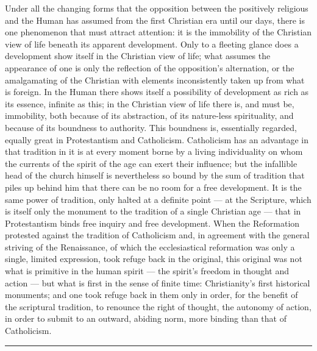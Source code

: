 \documentclass[12pt,a4paper,openany]{book}
\newcommand{\opage}[1]{\marginnote{\footnotesize\textit{[#1]}}}
\begin{document}
Under all the changing forms that the opposition
between the positively religious and the Human has assumed
from the first Christian era until our days, there is
one phenomenon that must attract attention: it is
the immobility of the Christian view of life beneath its apparent
development. Only to a fleeting glance does
a development show itself in the Christian view of life; what assumes
the appearance of one is only the reflection of the opposition's
alternation, or the amalgamating of the Christian with
elements inconsistently taken up from what is foreign. In
the Human there shows itself a possibility of development as rich as
its essence, infinite as this; in the Christian view of life
there is, and must be, immobility, both because
of its abstraction, of its nature-less spirituality, and because
of its boundness to authority. This boundness
is, essentially regarded, equally great in Protestantism and Catholicism.
Catholicism has an advantage in that tradition
in it is at every moment borne by a living individuality
on whom the currents of the spirit of the age can exert their
influence; but the infallible head of the church himself is nevertheless
so bound by the sum of tradition that piles
\opage{295}up behind him that there can be no room for a free development.
It is the same power of tradition, only halted
at a definite point --- at the Scripture, which is itself only
the monument to the tradition of a single Christian age ---
that in Protestantism binds free inquiry and free
development. When the Reformation protested against the tradition of Catholicism
and, in agreement with the general striving
of the Renaissance, of which the ecclesiastical reformation
was only a single, limited expression, took refuge back
in the original, this original was not what is
primitive in the human spirit --- the spirit's freedom in thought and
action --- but what is first in the sense of finite time: Christianity's
first historical monuments; and one took refuge back
in them only in order, for the benefit of the scriptural tradition, to
renounce the right of thought, the autonomy of action, in order
to submit to an outward, abiding norm, more binding than
that of Catholicism.

\begin{center}\rule{1.8cm}{0.4pt}\end{center}
\end{document}
